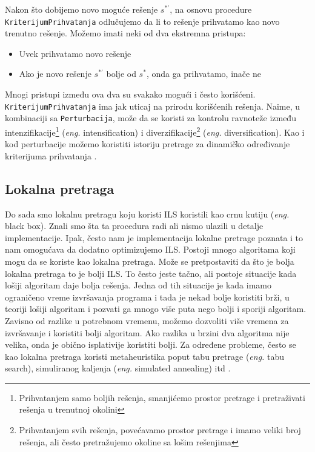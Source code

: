 \documentclass[a4paper]{article}
\newcommand{\sstar}[0]{$\textit{s}^*$}
\newcommand{\eng}[1]{(\textit{eng.} #1)}
\newcommand{\kriterijum}[0]{\small{\texttt{KriterijumPrihvatanja}}}
\newcommand{\perturbacija}[0]{\small{\texttt{Perturbacija}}}
\begin{document}
Nakon što dobijemo novo moguće rešenje $\textit{s}^{*\prime}$, na osnovu procedure \kriterijum{} odlučujemo da li to rešenje prihvatamo kao novo trenutno rešenje. 
Možemo imati neki od dva ekstremna pristupa:
\begin{itemize}
  \item Uvek prihvatamo novo rešenje
  \item Ako je novo rešenje $\textit{s}^{*\prime}$ bolje od \sstar{}, onda ga prihvatamo, inače ne
\end{itemize}
Mnogi pristupi između ova dva su svakako mogući i često korišćeni. \\
\kriterijum{} ima jak uticaj na prirodu korišćenih rešenja. Naime, u kombinaciji sa \perturbacija{}, može da se 
koristi za kontrolu ravnoteže između intenzifikacije\footnote{Prihvatanjem samo boljih rešenja, smanjićemo prostor pretrage i pretraživati rešenja u trenutnoj okolini} \eng{intensification} 
i diverzifikacije\footnote{Prihvatanjem svih rešenja, povećavamo prostor pretrage i imamo veliki broj rešenja, ali često pretražujemo okoline sa lošim rešenjima} \eng{diversification}. Kao i kod perturbacije 
možemo koristiti istoriju pretrage za dinamičko određivanje kriterijuma prihvatanja \cite{handbookOfMetaheuristics, beginnersIntroduction}. 

\subsection{Lokalna pretraga}

Do sada smo lokalnu pretragu koju koristi ILS koristili kao crnu kutiju \eng{black box}. Znali smo šta ta procedura radi ali nismo ulazili u detalje implementacije. Ipak, često nam je implementacija lokalne pretrage poznata 
i to nam omogućava da dodatno optimizujemo ILS. Postoji mnogo algoritama koji mogu da se koriste kao lokalna pretraga. Može se pretpostaviti da što je bolja lokalna pretraga to je bolji ILS. To često jeste tačno, ali postoje 
situacije kada lošiji algoritam daje bolja rešenja. Jedna od tih situacije je kada imamo ograničeno vreme izvršavanja programa i tada je nekad bolje koristiti brži, u teoriji lošiji algoritam i pozvati ga mnogo više puta nego 
bolji i sporiji algoritam. Zavisno od razlike u potrebnom vremenu, možemo dozvoliti više vremena za izvršavanje i koristiti bolji algoritam. Ako razlika u brzini dva algoritma nije velika, onda je obično isplativije koristiti bolji. 
Za određene probleme, često se kao lokalna pretraga koristi metaheuristika poput tabu pretrage \eng{tabu search}, simuliranog kaljenja \eng{simulated annealing} itd \cite{handbookOfMetaheuristics}.
\end{document}

